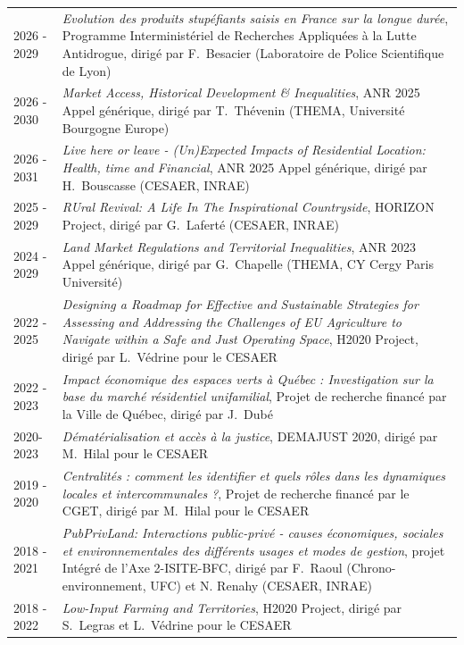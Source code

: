 \documentclass[a4paper,12pt]{article}
\begin{document}
\noindent \begin{longtable}{@{}p{\annee}p{\texte}@{}}
2026 - 2029 & \og{}\textit{Evolution des produits stupéfiants saisis en France sur la longue durée}\fg{}, Programme Interministériel de Recherches Appliquées à la Lutte Antidrogue, dirigé par F.~Besacier (Laboratoire de Police Scientifique de Lyon) \\
2026 - 2030 & \og{}\textit{Market Access, Historical Development \& Inequalities}\fg{}, ANR 2025 Appel générique, dirigé par T.~Thévenin (THEMA, Université Bourgogne Europe) \\
2026 - 2031 & \og{}\textit{Live here or leave - (Un)Expected Impacts of Residential Location: Health, time and Financial}\fg{}, ANR 2025 Appel générique, dirigé par H.~Bouscasse (CESAER, INRAE) \\
2025 - 2029 & \og{}\textit{RUral Revival: A Life In The Inspirational Countryside}\fg{}, HORIZON Project, dirigé par G.~Laferté (CESAER, INRAE) \\
2024 - 2029 & \og{}\textit{Land Market Regulations and Territorial Inequalities}\fg{}, ANR 2023 Appel générique, dirigé par G.~Chapelle (THEMA, CY Cergy Paris Université) \\
2022 - 2025 & \og{}\textit{Designing a Roadmap for Effective and Sustainable Strategies for Assessing and Addressing the Challenges of EU Agriculture to Navigate within a Safe and Just Operating Space}\fg{}, H2020 Project, dirigé par L.~Védrine pour le CESAER \\
2022 - 2023 & \og{}\textit{Impact économique des espaces verts à Québec : Investigation sur la base du marché résidentiel unifamilial}\fg{}, Projet de recherche financé par la Ville de Québec, dirigé par J.~Dubé \\
2020- 2023 & \og{}\textit{Dématérialisation et accès à la justice}\fg{}, DEMAJUST 2020, dirigé par M.~Hilal pour le CESAER \\
2019	 - 2020 & \og{}\textit{Centralités : comment les identifier et quels rôles dans les dynamiques locales et intercommunales ?}\fg{}, Projet de recherche financé par le CGET, dirigé par M.~Hilal pour le CESAER \\
2018 - 2021 & \og{}\textit{PubPrivLand: Interactions public-privé - causes économiques, sociales et environnementales des différents usages et modes de gestion}\fg{}, projet Intégré  de l'Axe 2-ISITE-BFC, dirigé par F.~Raoul (Chrono-environnement, UFC) et N. Renahy (CESAER, INRAE) \\
2018 - 2022 & \og{}\textit{Low-Input Farming and Territories}\fg{}, H2020 Project, dirigé par S.~Legras et L.~Védrine pour le CESAER \\

\end{longtable}
\end{document}
